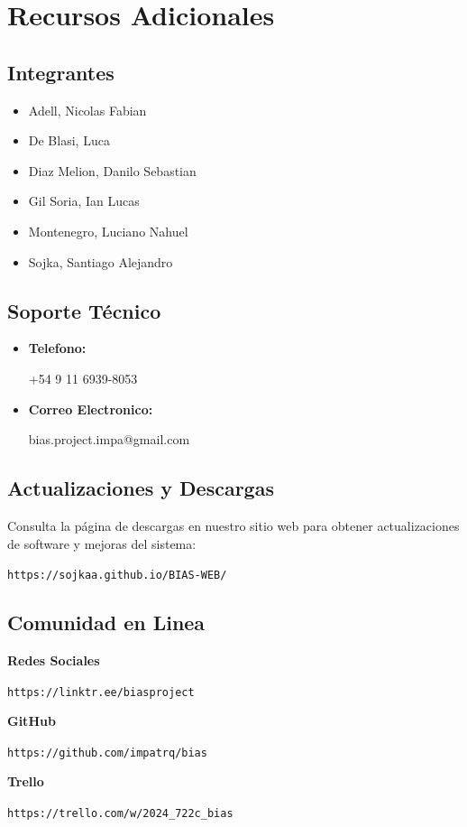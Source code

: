 \documentclass{article}
\begin{document}
\section{Recursos Adicionales}
\begin{multicols}{2}

    \subsection{Integrantes} 
    \begin{itemize}
        \item Adell, Nicolas Fabian 
        \item De Blasi, Luca 
        \item Diaz Melion, Danilo Sebastian 
        \item Gil Soria, Ian Lucas 
        \item Montenegro, Luciano Nahuel 
        \item Sojka, Santiago Alejandro 
    \end{itemize}
    
    \subsection{Soporte Técnico} 
    \begin{itemize}
        \item \textbf{Telefono:}
        
        +54 9 11 6939-8053
        \item \textbf{Correo Electronico:}
        
        bias.project.impa@gmail.com
    \end{itemize}
    
    \columnbreak
    
    \subsection{Actualizaciones y Descargas} 
    Consulta la página de descargas en nuestro sitio web para obtener actualizaciones de software y mejoras del sistema: 
    
    
    \texttt {https://sojkaa.github.io/BIAS-WEB/}
    
    \subsection{Comunidad en Linea}
    \textbf{Redes Sociales} 
    
    \texttt{https://linktr.ee/biasproject} 
    
    \textbf{GitHub} 
    
    \texttt{https://github.com/impatrq/bias} 
    
    \textbf{Trello} 
    
    \texttt{https://trello.com/w/2024_722c_bias} 

\end{multicols}
\end{document}
